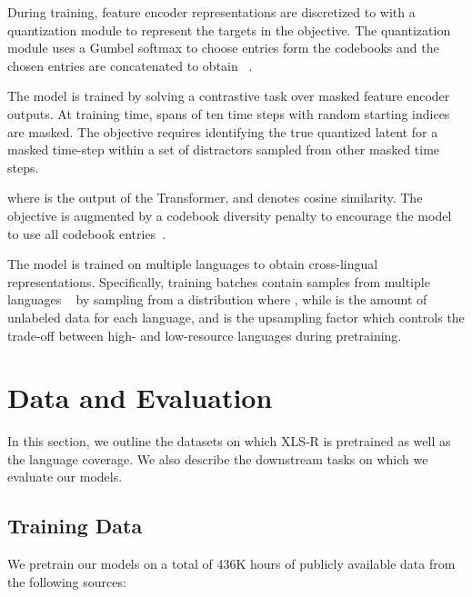\documentclass{article} \usepackage{iclr2022_conference,times}
\newcommand{\xlsrp}{XLS-R}
\begin{document}
During training, feature encoder representations are discretized to  with a quantization module  to represent the targets in the objective.
The quantization module uses a Gumbel softmax to choose entries form the codebooks and the chosen entries are concatenated to obtain ~\citep{jegou2011ieee,jang2016gumbel,baevski2019vqwav2vec}.

The model is trained by solving a contrastive task over masked feature encoder outputs.
At training time, spans of ten time steps with random starting indices are masked.
The objective requires identifying the true quantized latent  for a masked time-step within a set of  distractors  sampled from other masked time steps.

where  is the output of the Transformer, and  denotes cosine similarity.
The objective is augmented by a codebook diversity penalty to encourage the model to use all codebook entries~\citep{dieleman2018challenge}.




The model is trained on multiple languages to obtain cross-lingual representations.
Specifically, training batches contain samples from multiple languages ~\citep{devlin2018bert,lample2019xlm,conneau2021xlsr} by sampling from a distribution  where , while  is the amount of unlabeled data for each language, and  is the upsampling factor which controls the trade-off between high- and low-resource languages during pretraining.


\section{Data and Evaluation}
In this section, we outline the datasets on which \xlsrp{} is pretrained as well as the language coverage. We also describe the downstream tasks on which we evaluate our models.

\subsection{Training Data}
\label{sec:traindata}
We pretrain our models on a total of 436K hours of publicly available data from the following sources:
\end{document}
